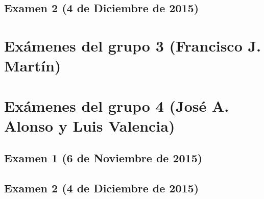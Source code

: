 \documentclass[a4paper,12pt,twoside]{book}
\begin{document}
\subsection{Examen 2 (4 de Diciembre de 2015)}

\section{Exámenes del grupo 3 (Francisco J. Martín)}

\section{Exámenes del grupo 4 (José A. Alonso y Luis Valencia)}
\subsection{Examen 1 (6 de Noviembre de 2015)}
\subsection{Examen 2 (4 de Diciembre de 2015)}
\end{document}
